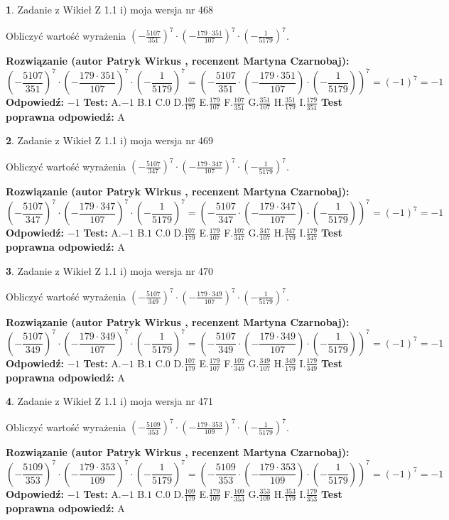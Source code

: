 \documentclass[12pt, a4paper]{article}
\theoremstyle{definition} %
\newtheorem{zad}{}
\newcommand{\zadStart}[1]{\begin{zad}#1\newline}
\newcommand{\zadStop}{\end{zad}}
\newcommand{\rozwStart}[2]{\noindent \textbf{Rozwiązanie (autor #1 , recenzent #2): }\newline}
\newcommand{\rozwStop}{\newline}
\newcommand{\odpStart}{\noindent \textbf{Odpowiedź:}\newline}
\newcommand{\odpStop}{\newline}
\newcommand{\testStart}{\noindent \textbf{Test:}\newline}
\newcommand{\testStop}{\newline}
\newcommand{\kluczStart}{\noindent \textbf{Test poprawna odpowiedź:}\newline}
\newcommand{\kluczStop}{\newline}
\begin{document}
\zadStart{Zadanie z Wikieł Z 1.1 i) moja wersja nr 468}

Obliczyć wartość wyrażenia $(-\frac{5107}{351})^{7} \cdot (-\frac{179 \cdot 351}{107})^{7} \cdot (-\frac{1}{5179})^{7}$.
\zadStop
\rozwStart{Patryk Wirkus}{Martyna Czarnobaj}
$$(-\frac{5107}{351})^{7} \cdot (-\frac{179 \cdot 351}{107})^{7} \cdot (-\frac{1}{5179})^{7} = (-\frac{5107}{351} \cdot (-\frac{179 \cdot 351}{107}) \cdot (-\frac{1}{5179}))^{7} = (-1)^{7} = -1$$
\rozwStop
\odpStart
$-1$
\odpStop
\testStart
A.$-1$ B.$1$ C.$0$ D.$\frac{107}{179}$ E.$\frac{179}{107}$
F.$\frac{107}{351}$ G.$\frac{351}{107}$
H.$\frac{351}{179}$
I.$\frac{179}{351}$
\testStop
\kluczStart
A
\kluczStop



\zadStart{Zadanie z Wikieł Z 1.1 i) moja wersja nr 469}

Obliczyć wartość wyrażenia $(-\frac{5107}{347})^{7} \cdot (-\frac{179 \cdot 347}{107})^{7} \cdot (-\frac{1}{5179})^{7}$.
\zadStop
\rozwStart{Patryk Wirkus}{Martyna Czarnobaj}
$$(-\frac{5107}{347})^{7} \cdot (-\frac{179 \cdot 347}{107})^{7} \cdot (-\frac{1}{5179})^{7} = (-\frac{5107}{347} \cdot (-\frac{179 \cdot 347}{107}) \cdot (-\frac{1}{5179}))^{7} = (-1)^{7} = -1$$
\rozwStop
\odpStart
$-1$
\odpStop
\testStart
A.$-1$ B.$1$ C.$0$ D.$\frac{107}{179}$ E.$\frac{179}{107}$
F.$\frac{107}{347}$ G.$\frac{347}{107}$
H.$\frac{347}{179}$
I.$\frac{179}{347}$
\testStop
\kluczStart
A
\kluczStop



\zadStart{Zadanie z Wikieł Z 1.1 i) moja wersja nr 470}

Obliczyć wartość wyrażenia $(-\frac{5107}{349})^{7} \cdot (-\frac{179 \cdot 349}{107})^{7} \cdot (-\frac{1}{5179})^{7}$.
\zadStop
\rozwStart{Patryk Wirkus}{Martyna Czarnobaj}
$$(-\frac{5107}{349})^{7} \cdot (-\frac{179 \cdot 349}{107})^{7} \cdot (-\frac{1}{5179})^{7} = (-\frac{5107}{349} \cdot (-\frac{179 \cdot 349}{107}) \cdot (-\frac{1}{5179}))^{7} = (-1)^{7} = -1$$
\rozwStop
\odpStart
$-1$
\odpStop
\testStart
A.$-1$ B.$1$ C.$0$ D.$\frac{107}{179}$ E.$\frac{179}{107}$
F.$\frac{107}{349}$ G.$\frac{349}{107}$
H.$\frac{349}{179}$
I.$\frac{179}{349}$
\testStop
\kluczStart
A
\kluczStop



\zadStart{Zadanie z Wikieł Z 1.1 i) moja wersja nr 471}

Obliczyć wartość wyrażenia $(-\frac{5109}{353})^{7} \cdot (-\frac{179 \cdot 353}{109})^{7} \cdot (-\frac{1}{5179})^{7}$.
\zadStop
\rozwStart{Patryk Wirkus}{Martyna Czarnobaj}
$$(-\frac{5109}{353})^{7} \cdot (-\frac{179 \cdot 353}{109})^{7} \cdot (-\frac{1}{5179})^{7} = (-\frac{5109}{353} \cdot (-\frac{179 \cdot 353}{109}) \cdot (-\frac{1}{5179}))^{7} = (-1)^{7} = -1$$
\rozwStop
\odpStart
$-1$
\odpStop
\testStart
A.$-1$ B.$1$ C.$0$ D.$\frac{109}{179}$ E.$\frac{179}{109}$
F.$\frac{109}{353}$ G.$\frac{353}{109}$
H.$\frac{353}{179}$
I.$\frac{179}{353}$
\testStop
\kluczStart
A
\kluczStop
\end{document}
